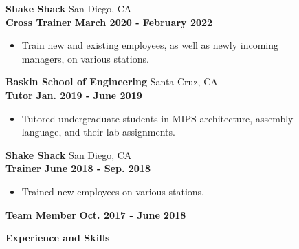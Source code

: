 \documentclass[a4paper]{article}
\newcommand{\lineunder} {
    \vspace*{-8pt} \\
    \hspace*{-18pt} \hrulefill \\
}
\newcommand{\header} [1] {
    {\hspace*{-18pt}\vspace*{6pt}\LARGE \textbf{#1}}
    \vspace*{-6pt} \lineunder
}
\begin{document}
\textbf{Shake Shack} \hfill San Diego, CA\\
\hspace{4mm} \textbf{Cross Trainer} \hfill \textbf{March 2020 - February 2022}\\
\vspace{-2mm}
\begin{itemize} \itemsep 1pt
	\item Train new and existing employees, as well as newly incoming\\ managers, on various stations.
\end{itemize}

\textbf{Baskin School of Engineering} \hfill Santa Cruz, CA\\
\hspace{4mm} \textbf{Tutor} \hfill \textbf{Jan. 2019 - June 2019}\\
\vspace{-2mm}
\begin{itemize} \itemsep 1pt
	\item Tutored undergraduate students in MIPS architecture, assembly\\language, and their lab assignments.
\end{itemize}

\textbf{Shake Shack} \hfill San Diego, CA\\
\hspace{4mm} \textbf{Trainer} \hfill \textbf{June 2018 - Sep. 2018}\\
\vspace{-2mm}
\begin{itemize} \itemsep 1pt
	\item Trained new employees on various stations.
\end{itemize}

\hspace{4mm} \textbf{Team Member} \hfill \textbf{Oct. 2017 - June 2018}\\
\vspace{3mm}
\header{Experience and Skills}
\vspace{1mm}
\end{document}
